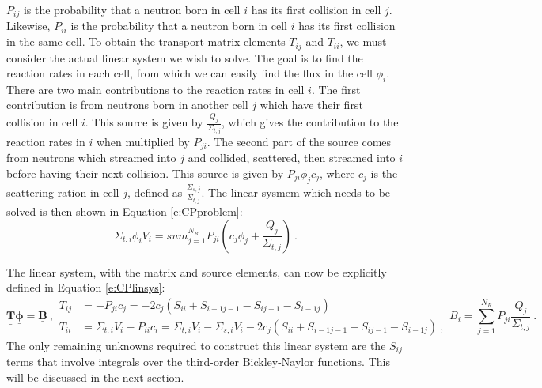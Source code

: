 $P_{ij}$ is the probability that a neutron born in cell $i$ has its first collision in cell $j$.  Likewise, $P_{ii}$ is the probability that a neutron born in cell $i$ has its first collision in the same cell.  To obtain the transport matrix elements $T_{ij}$ and $T_{ii}$, we must consider the actual linear system we wish to solve.  The goal is to find the reaction rates in each cell, from which we can easily find the flux in the cell $\phi_i$.  There are two main contributions to the reaction rates in cell $i$.  The first contribution is from neutrons born in another cell $j$ which have their first collision in cell $i$.  This source is given by $\frac{Q_j}{\Sigma_{t,j}}$, which gives the contribution to the reaction rates in $i$ when multiplied by $P_{ji}$.  The second part of the source comes from neutrons which streamed into $j$ and collided, scattered, then streamed into $i$ before having their next collision.  This source is given by $P_{ji} \phi_j c_j$, where $c_j$ is the scattering ration in cell $j$, defined as $\frac{\Sigma_{s,j}}{\Sigma_{t,j}}$.  The linear sysmem which needs to be solved is then shown in Equation \ref{e:CPproblem}:
\begin{equation}\label{e:CPproblem}
\Sigma_{t,i} \phi_i V_i = sum_{j=1}^{N_R} P_{ji}\left(c_j\phi_j + \frac{Q_j}{\Sigma_{t,j}}\right)\ .
\end{equation}

The linear system, with the matrix and source elements, can now be explicitly defined in Equation \ref{e:CPlinsys}:
\begin{subequations}\label{e:CPlinsys}
  \begin{equation}
  \underline{\underline{\bm T}}\underline{\bm\phi} = \underline{\bm B}\ ,
  \end{equation}
  \begin{align}
  T_{ij} &= -P_{ji} c_j = -2 c_j \left(S_{ii} + S_{i-1j-1} - S_{ij-1} - S_{i-1j}\right) \\
  T_{ii} &= \Sigma_{t,i} V_i - P_{ii} c_i = \Sigma_{t,i} V_i - \Sigma_{s,i} V_i - 2 c_j \left(S_{ii} + S_{i-1j-1} - S_{ij-1} - S_{i-1j}\right)\ ,
  \end{align}
  \begin{equation}
  B_i =\sum_{j=1}^{N_R} P_{ji} \frac{Q_j}{\Sigma_{t,j}}\ .
  \end{equation}
\end{subequations}
The only remaining unknowns required to construct this linear system are the $S_{ij}$ terms that involve integrals over the third-order Bickley-Naylor functions.  This will be discussed in the next section.

